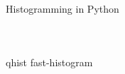 \documentclass[aspectratio=169]{beamer}
\begin{document}
\begin{frame}{Histogramming in Python}
\begin{columns}
\begin{tabular}{c l c p{2.5 cm} p{2 cm} p{4 cm}}
\end{tabular}
\end{columns}
qhist
fast-histogram

\end{frame}





\end{document}
